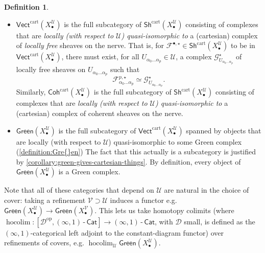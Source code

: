 \documentclass[11pt,fleqn]{article}
\theoremstyle{plain}
\theoremstyle{definition}
\newtheorem{definition}[theorem]{Definition}
\theoremstyle{remark}
\numberwithin{equation}{theorem}
\newcommand{\cover}{\mathcal{U}}
\newcommand{\anothercover}{\mathcal{V}}
\newcommand{\anotherbullet}{\star}
\newcommand{\infcat}{(\infty,1)\,\text{-}\,\mathsf{Cat}}
\newcommand{\cartvectX}{\mathsf{Vect}^\mathrm{cart}(X_\bullet^\cover)}
\newcommand{\cartcohX}{\mathsf{Coh}^\mathrm{cart}(X_\bullet^\cover)}
\newcommand{\cartshX}{\mathsf{Sh}^\mathrm{cart}(X_\bullet^\cover)}
\newcommand{\greenX}{\mathsf{Green}(X_\bullet^\cover)}
\newcommand{\greenVX}{\mathsf{Green}(X_\bullet^\anothercover)}
\DeclareMathOperator{\hocolim}{hocolim}
\begin{document}
\begin{definition}
\begin{itemize}
                \item $\cartvectX$ is the full subcategory of $\cartshX$ consisting of complexes that are \emph{locally (with respect to $\cover$) quasi-isomorphic to} a (cartesian) complex of \emph{locally free} sheaves on the nerve.
                    That is, for $\mathcal{F}^{\bullet,\anotherbullet}\in\cartshX$ to be in $\cartvectX$, there must exist, for all $U_{\alpha_0\ldots\alpha_p}\in\cover$, a complex $\mathcal{G}_{U_{\alpha_0\ldots\alpha_p}}^{\anotherbullet}$ of {locally free} sheaves on $U_{\alpha_0\ldots\alpha_p}$ such that \[\mathcal{F}^{p,\anotherbullet}_{\alpha_0\ldots\alpha_p} \simeq \mathcal{G}_{U_{\alpha_0\ldots\alpha_p}}^\anotherbullet.\]
                    Similarly, $\cartcohX$ is the full subcategory of $\cartshX$ consisting of complexes that are \emph{locally (with respect to $\cover$) quasi-isomorphic to} a (cartesian) complex of coherent sheaves on the nerve.
                \item $\greenX$ is the full subcategory of $\cartvectX$ spanned by objects that are locally (with respect to $\cover$) quasi-isomorphic to some Green complex (\cref{definition:Gre{}en})
                    The fact that this actually is a subcategory is justified by \cref{corollary:green-gives-cartesian-things}.
                    By definition, every object of $\greenX$ is a Gre{}en complex.
            \end{itemize}

            Note that all of these categories that depend on $\cover$ are natural in the choice of cover: taking a refinement $\anothercover\supset\cover$ induces a functor e.g. $\greenX\to\greenVX$.
            This lets us take homotopy colimits (where $\hocolim\colon[\mathcal{D}^\mathrm{op},\infcat]\to\infcat$, with $\mathcal{D}$ small, is defined as the $(\infty,1)$-categorical left adjoint to the constant-diagram functor) over refinements of covers, e.g. $\hocolim_\cover\greenX$.
        \end{definition}
\end{document}
